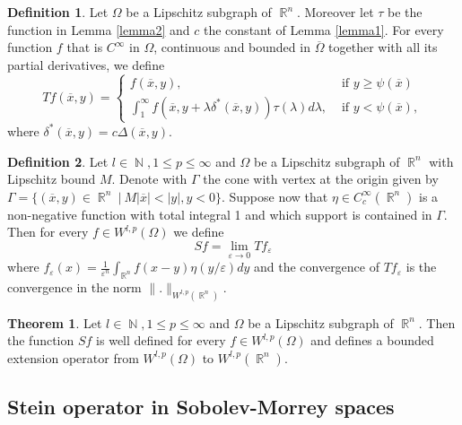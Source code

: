 \documentclass[12pt]{article}
\theoremstyle{definition}
\newtheorem{definition}{Definition}
\newtheorem{theorem}{Theorem}
\DeclareMathOperator\rr{\mathbb{R}}
\DeclareMathOperator\nn{\mathbb{N}}
\begin{document}
\begin{definition}Let $\Omega$ be a Lipschitz subgraph of $\rr^n$. Moreover let $\tau$ be the function in Lemma \ref{lemma2} and $c$ the constant of Lemma \ref{lemma1}. For every function $f$ that is $C^\infty$ in $\Omega$, continuous and bounded in $\overline \Omega$ together with all its partial derivatives, we define
\[ Tf(\overline x, y)= \begin{cases}
						f(\overline x, y), & \text{ if } y\ge\psi(\overline x) \\
						\int_1^\infty f(\overline x, y+ \lambda \delta^*(\overline x,y))\tau(\lambda)d\lambda, & \text{ if } y<\psi(\overline x),		
\end{cases}
\]
where $\delta^*(\overline x,y)=c\Delta(\overline x, y).$
\end{definition}

\begin{definition}Let $l \in \nn,1\le p \le \infty$ and $\Omega$ be a Lipschitz subgraph of $\rr^n$ with Lipschitz bound $M$. Denote with $\Gamma$ the cone with vertex at the origin given by $\Gamma=\{(\overline x, y) \in \rr^n \ | \ M |\overline x|<|y|, y<0 \}$. Suppose now that $\eta \in C^\infty_c(\rr^n)$ is a non-negative function with total integral 1 and which support is contained in $\Gamma.$ Then for every $f \in W^{l,p}(\Omega)$ we define
\[ Sf = \lim_{\varepsilon \to 0} Tf_\varepsilon \]
where $f_\varepsilon(x)=\frac{1}{\varepsilon^n}\int_{\rr^n} f(x-y) \eta(y/\varepsilon)dy$ and the convergence of $Tf_\varepsilon$ is the convergence in the norm  $\|. \|_{W^{l,p}(\rr^n)}$.
\end{definition}


\begin{theorem}
Let $l \in \nn,1\le p \le \infty$ and $\Omega$ be a Lipschitz subgraph of $\rr^n$. Then the function $Sf$ is well defined for every $f \in W^{l,p}(\Omega)$ and defines a bounded extension operator from $W^{l,p}(\Omega)$ to $W^{l,p}(\rr^n).$
\end{theorem}




\subsection{Stein operator in Sobolev-Morrey spaces}
\end{document}
